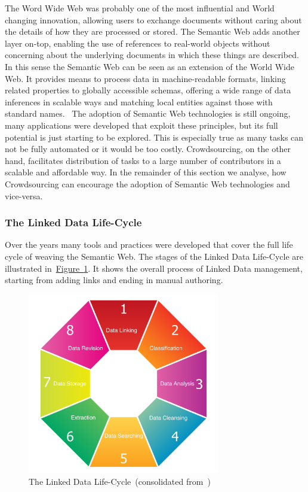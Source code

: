 \documentclass[draft,final]{vutinfth} %
\begin{document}
The Word Wide Web was probably one of the most influential and World changing innovation, allowing users to exchange documents without caring about the details of how they are processed or stored. The Semantic Web adds another layer on-top, enabling the use of references to real-world objects without concerning about the underlying documents in which these things are described. In this sense the Semantic Web can be seen as an extension of the World Wide Web. It provides means to process data in machine-readable formats, linking related properties to globally accessible schemas, offering a wide range of data inferences in scalable ways and matching local entities against those with standard names.~\cite{hendler2010} 
The adoption of Semantic Web technologies is still ongoing, many applications were developed that exploit these principles, but its full potential is just starting to be explored. This is especially true as many tasks can not be fully automated or it would be too costly. Crowdsourcing, on the other hand, facilitates distribution of tasks to a large number of contributors in a scalable and affordable way. In the remainder of this section we analyse, how Crowdsourcing can encourage the adoption of Semantic Web technologies and vice-versa. 

\subsubsection{The Linked Data Life-Cycle}
Over the years many tools and practices were developed that cover the full life cycle of weaving the Semantic Web. The stages of the Linked Data Life-Cycle are illustrated in~\hyperref[fig:linked_data_life_cycle]{Figure~\ref*{fig:linked_data_life_cycle}}. It shows the overall process of Linked Data management, starting from adding links and ending in manual authoring. 
\begin{figure}
	 \centering
	 \includegraphics[width=0.75\textwidth]{drawio/Linked_Data_Life_Cycle}
	 \caption{The Linked Data Life-Cycle~(consolidated from~\cite{auer2011, auer2012, siorpaes2008})}\label{fig:linked_data_life_cycle}
\end{figure}  
\end{document}
